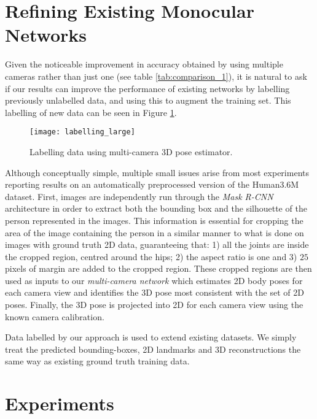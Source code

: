\documentclass[10pt,twocolumn,letterpaper]{article}
\begin{document}
\section{Refining Existing Monocular Networks}
Given the noticeable improvement in accuracy obtained by using
multiple cameras rather than just one (see table
\ref{tab:comparison_1}), it is natural to ask if our results can
improve the performance of existing networks by labelling
previously unlabelled data, and using this to augment the training
set. This labelling of new data can be seen in Figure
 \ref{fig:labelling}.  


\begin{figure}[t]
  \texttt{[image: labelling\_large]}
  \caption{Labelling data using multi-camera 3D pose
   estimator.\label{fig:labelling}}
\end{figure}
Although conceptually simple, multiple small issues arise
from most experiments reporting results on an automatically
preprocessed version of the Human3.6M dataset.
   First, images are independently run through the
 \emph{Mask R-CNN} architecture \cite{he2017mask} in order to extract
 both the bounding box and the silhouette of the person represented in
 the images. This information is essential for cropping the area of
 the image containing the person in a similar manner to what is done
 on images with ground truth 2D data, guaranteeing that: 1) all the
 joints are inside the cropped region, centred around the hips; 2)
 the aspect ratio is one and 3) $25$ pixels of margin are added to the
 cropped region. These cropped regions are then used as inputs to our
 \emph{multi-camera network} which estimates 2D body poses for each 
 camera view and identifies the 3D pose most consistent with the set
 of 2D poses.  Finally, the 3D pose is projected into 2D for each 
 camera view using the known camera calibration.

 Data labelled by our approach is used to extend existing datasets. We
 simply treat the predicted bounding-boxes, 2D landmarks and 3D
 reconstructions the same way as  existing ground truth training
 data.
 
 \section{Experiments}
\label{sec:results}
\end{document}
